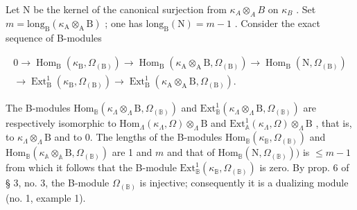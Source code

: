 Let N be the kernel of the canonical surjection from \(\kappa_{A} \otimes_{A} B\) on \(\kappa_{B}\) . Set \(m = \text{long}_{\text{B}}(\kappa_{\text{A}} \otimes_{\text{A}} \text{B})\) ; one has \(\text{long}_{\text{B}}(\text{N}) = m - 1\) . Consider the exact sequence of B-modules

\[
\begin{array}{c} 0 \to \operatorname{Hom} _ {\mathrm{B}} (\kappa_ {\mathrm{B}}, \Omega_ {(\mathrm{B})}) \longrightarrow \operatorname{Hom} _ {\mathrm{B}} (\kappa_ {\mathrm{A}} \otimes_ {\mathrm{A}} \mathrm{B}, \Omega_ {(\mathrm{B})}) \longrightarrow \operatorname{Hom} _ {\mathrm{B}} (\mathrm{N}, \Omega_ {(\mathrm{B})}) \\ \longrightarrow \operatorname{Ext} _ {\mathrm{B}} ^ {1} (\kappa_ {\mathrm{B}}, \Omega_ {(\mathrm{B})}) \longrightarrow \operatorname{Ext} _ {\mathrm{B}} ^ {1} (\kappa_ {\mathrm{A}} \otimes_ {\mathrm{A}} \mathrm{B}, \Omega_ {(\mathrm{B})}). \end{array}
\]

The B-modules \(\mathrm{Hom}_{\mathbb{B}}(\kappa_{\Lambda}\otimes_{\Lambda}\mathrm{B},\Omega_{(\mathbb{B})})\) and \(\mathrm{Ext}_{\mathbb{B}}^{1}(\kappa_{\Lambda}\otimes_{\Lambda}\mathrm{B},\Omega_{(\mathbb{B})})\) are respectively isomorphic to \(\mathrm{Hom}_{\Lambda}(\kappa_{\Lambda},\Omega)\otimes_{\Lambda}\mathrm{B}\) and \(\mathrm{Ext}_{\mathbb{A}}^{1}(\kappa_{\Lambda},\Omega)\otimes_{\Lambda}\mathrm{B}\) , that is, to \(\kappa_{\Lambda}\otimes_{\Lambda}\mathrm{B}\) and to 0. The lengths of the B-modules \(\mathrm{Hom}_{\mathbb{B}}(\kappa_{\mathbb{B}},\Omega_{(\mathbb{B})})\) and \(\mathrm{Hom}_{\mathbb{B}}(\kappa_{\mathbb{A}}\otimes_{\mathbb{A}}\mathrm{B},\Omega_{(\mathbb{B})})\) are 1 and \(m\) and that of \(\mathrm{Hom}_{\mathbb{B}}(\mathrm{N},\Omega_{(\mathbb{B})}))\) is \(\leqslant m - 1\) from which it follows that the B-module \(\mathrm{Ext}_{\mathbb{B}}^{1}(\kappa_{\mathbb{B}},\Omega_{(\mathbb{B})})\) is zero. By prop. 6 of § 3, no. 3, the B-module \(\Omega_{(\mathbb{B})}\) is injective; consequently it is a dualizing module (no. 1, example 1).

